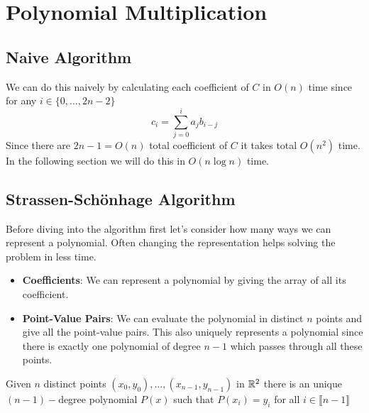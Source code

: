 \chapter{Polynomial Multiplication}
\begin{algoprob}
\end{algoprob}
\section{Naive Algorithm}
We can do this naively by calculating each coefficient of $C$ in $O(n)$ time since for any $i\in\{0,\dots, 2n-2\}$ $$c_i=\sum_{j=0}^ia_jb_{i-j}$$Since there are $2n-1=O(n)$ total coefficient of $C$ it takes total $O(n^2)$ time. In the following section we will do this in $O(n\log n)$ time.
\section{Strassen-Sch\"{o}nhage Algorithm}
Before diving into the algorithm first let's consider how many ways we can represent a polynomial. Often changing the representation helps solving the problem in less time.\begin{itemize}
	\item \textbf{Coefficients}: We can represent a polynomial by giving the array of all its coefficient.
	\item \textbf{Point-Value Pairs}: We can evaluate the polynomial in distinct $n$ points and give all the point-value pairs. This also uniquely represents a polynomial since there is exactly one polynomial of degree $n-1$ which passes through all these points. 
\end{itemize}
\begin{Theorem}{}{}
	Given $n$ distinct points $(x_0,y_0),\dots, (x_{n-1},y_{n-1})$ in $\mathbb{R}^2$ there is an unique $(n-1)-$degree polynomial $P(x)$ such that $P(x_i)=y_i$ for all $i\in \llbracket n-1\rrbracket$
\end{Theorem}
\parinn

